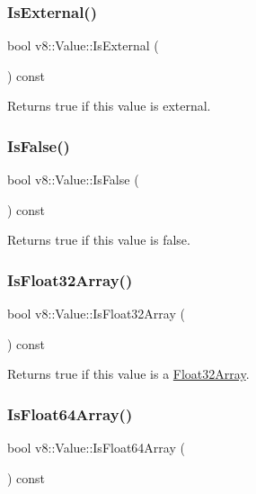 \subsubsection{\texorpdfstring{Is\+External()}{IsExternal()}}
{\footnotesize\ttfamily bool v8\+::\+Value\+::\+Is\+External (\begin{DoxyParamCaption}{ }\end{DoxyParamCaption}) const}

Returns true if this value is external. \mbox{\label{classv8_1_1Value_a84b6682c5582e0ae14d85bd9b6f25522}} 
\subsubsection{\texorpdfstring{Is\+False()}{IsFalse()}}
{\footnotesize\ttfamily bool v8\+::\+Value\+::\+Is\+False (\begin{DoxyParamCaption}{ }\end{DoxyParamCaption}) const}

Returns true if this value is false. \mbox{\label{classv8_1_1Value_aafedbffb06cdd267149f241ad7926d9d}} 
\subsubsection{\texorpdfstring{Is\+Float32\+Array()}{IsFloat32Array()}}
{\footnotesize\ttfamily bool v8\+::\+Value\+::\+Is\+Float32\+Array (\begin{DoxyParamCaption}{ }\end{DoxyParamCaption}) const}

Returns true if this value is a \mbox{\hyperlink{classv8_1_1Float32Array}{Float32\+Array}}. \mbox{\label{classv8_1_1Value_a7ed4de7b1d4467cdd69eb128b3ecfdf2}} 
\subsubsection{\texorpdfstring{Is\+Float64\+Array()}{IsFloat64Array()}}
{\footnotesize\ttfamily bool v8\+::\+Value\+::\+Is\+Float64\+Array (\begin{DoxyParamCaption}{ }\end{DoxyParamCaption}) const}


